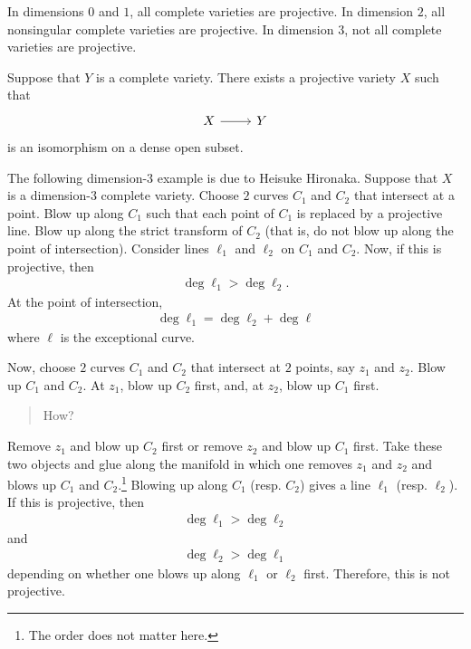 \documentclass [11 pt, oneside] {article}
\begin{document}
In dimensions $0$ and $1$, all complete varieties are projective. In dimension $2$, all nonsingular complete varieties are projective. In dimension $3$, not all complete varieties are projective. 

\begin{lemma}[Chow]\label{chow}\text{}
Suppose that $Y$ is a complete variety. There exists a projective variety $X$ such that
\[
\begin{tikzcd}
X\ar[r]&Y
\end{tikzcd}
\] 
is an isomorphism on a dense open subset. 
\end{lemma}

\begin{example}\label{}\text{}
The following dimension-$3$ example is due to Heisuke Hironaka. Suppose that $X$ is a dimension-$3$ complete variety. Choose $2$ curves $C_1$ and $C_2$ that intersect at a point. Blow up along $C_1$ such that each point of $C_1$ is replaced by a projective line. Blow up along the strict transform of $C_2$  (that is, do not blow up along the point of intersection). Consider lines $\ell_1$ and $\ell_2$ on $C_1$ and $C_2$. Now, if this is projective, then
\begin{align*}
	\deg \ell_1 >\deg \ell_2.
\end{align*}
At the point of intersection,
\begin{align*}
	\deg \ell_1 = \deg \ell_2 + \deg \ell
\end{align*}
where $\ell$ is the exceptional curve.

Now, choose $2$ curves $C_1$ and $C_2$ that intersect at $2$ points, say $z_1$ and $z_2$. Blow up $C_1$ and $C_2$. At $z_1$, blow up $C_2$ first, and, at $z_2$, blow up $C_1$ first. 
\begin{quote}
	\small How?
\end{quote}
Remove $z_1$ and blow up $C_2$ first or remove $z_2$ and blow up $C_1$ first. Take these two objects and glue along the manifold in which one removes $z_1$ and $z_2$ and blows up $C_1$ and $C_2$.\footnote{The order does not matter here.} Blowing up along $C_1$ (resp. $C_2$) gives a line $\ell_1$ (resp. $\ell_2$). If this is projective, then
\begin{align*}
	\deg \ell_1 > \deg \ell_2
\end{align*}
and 
\begin{align*}
	\deg \ell_2 > \deg \ell_1
\end{align*}
depending on whether one blows up along $\ell_1$ or $\ell_2$ first. Therefore, this is not projective.
\end{example}
\end{document}
